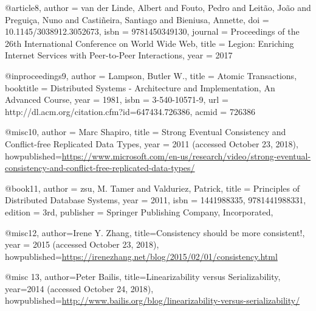 @article{8,
author = {van der Linde, Albert and Fouto, Pedro and Leit{\~{a}}o, Jo{\~{a}}o and Pregui{\c{c}}a, Nuno and Casti{\~{n}}eira, Santiago and Bieniusa, Annette},
doi = {10.1145/3038912.3052673},
isbn = {9781450349130},
journal = {Proceedings of the 26th International Conference on World Wide Web},
title = {{Legion: Enriching Internet Services with Peer-to-Peer Interactions}},
year = {2017}
}

@inproceedings{9,
 author = {Lampson, Butler W.},
 title = {Atomic Transactions},
 booktitle = {Distributed Systems - Architecture and Implementation, An Advanced Course},
 year = {1981},
 isbn = {3-540-10571-9},
 url = {http://dl.acm.org/citation.cfm?id=647434.726386},
 acmid = {726386}
} 

@misc{10,
author = {Marc Shapiro},
title = {Strong Eventual Consistency and Conflict-free Replicated Data Types},
year = {2011 (accessed October 23, 2018)}, 
howpublished={\url{https://www.microsoft.com/en-us/research/video/strong-eventual-consistency-and-conflict-free-replicated-data-types/}}
} 

@book{11,
 author = {zsu, M. Tamer and Valduriez, Patrick},
 title = {Principles of Distributed Database Systems},
 year = {2011},
 isbn = {1441988335, 9781441988331},
 edition = {3rd},
 publisher = {Springer Publishing Company, Incorporated},
} 

@misc{12, 
author={Irene Y. Zhang},
title={Consistency should be more consistent!},
year = {2015 (accessed October 23, 2018)}, 
howpublished={\url{https://irenezhang.net/blog/2015/02/01/consistency.html}}
}

@misc {13,
author={Peter Bailis},
title={Linearizability versus Serializability},
year={2014 (accessed October 24, 2018)},
howpublished={\url{http://www.bailis.org/blog/linearizability-versus-serializability/}}
}